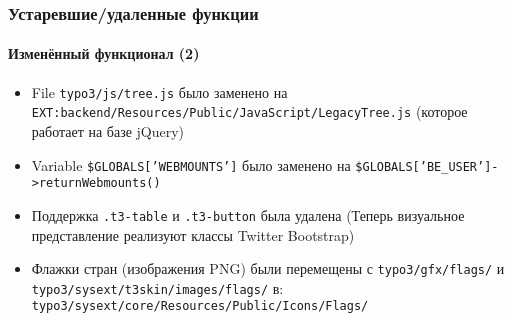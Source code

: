 \begin{frame}[fragile]
	\frametitle{Устаревшие/удаленные функции}
	\framesubtitle{Изменённый функционал (2)}

	\begin{itemize}

		\item File
			\small\texttt{typo3/js/tree.js}\normalsize\space
			было заменено на
			\small\texttt{EXT:backend/Resources/Public/JavaScript/LegacyTree.js}\normalsize\newline
			(которое работает на базе jQuery)

		\item Variable
			\small\texttt{\$GLOBALS['WEBMOUNTS']}\normalsize\space
			было заменено на
			\small\texttt{\$GLOBALS['BE\_USER']->returnWebmounts()}\normalsize

		\item Поддержка
			\small\texttt{.t3-table}\normalsize\space
			и
			\small\texttt{.t3-button}\normalsize\space
			была удалена\newline
			\small
				(Теперь визуальное представление реализуют классы Twitter Bootstrap)
			\normalsize

		\item Флажки стран (изображения PNG) были перемещены с
			\small\texttt{typo3/gfx/flags/}\normalsize
			и
			\small\texttt{typo3/sysext/t3skin/images/flags/}\normalsize\newline
			в: \small\texttt{typo3/sysext/core/Resources/Public/Icons/Flags/}\normalsize

	\end{itemize}

\end{frame}


